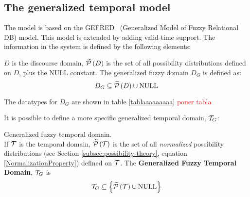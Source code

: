 %
%
%


\subsection{\label{subsec:temporal-model}The generalized temporal model}
The model is based on the GEFRED~\cite{Medina1994} (Generalized Model of Fuzzy Relational DB) model. This model is extended by adding valid-time support. The information in the system is defined by the following elements:

\begin{definition}
\label{def:generalized-fuzzy-domain}
$D$ is the discourse domain, $\widetilde {\mathcal{P}}\left(D \right)$ is the set of all possibility distributions defined on $D$, plus the NULL constant. The generalized fuzzy domain $D_G$ is defined as:
\begin{equation}
\label{eq:generalized-fuzzy-domain}
D_G \subseteq \widetilde {\mathcal{P}}\left(D \right)\cup \text{NULL}
\end{equation}
\end{definition}
The datatypes for $D_G$ are shown in table \ref{tablaaaaaaaaa}
\textcolor{red}{poner tabla}

It is possible to define a more specific generalized temporal domain, $\mathcal{T}_G$:

\begin{definition}
\label{def:generalized-fuzzy-temporal-domain}
Generalized fuzzy temporal domain.\\
If $\mathcal{T}$ is the temporal domain, $\widetilde {\mathcal{P}}\left( \mathcal{T}\right)$ is the set of all \emph{normalized} possibility distributions (see Section \ref{subsec:possibility-theory}, equation \eqref{NormalizationProperty}) defined on $\mathcal{T}$.
The \textbf{Generalized Fuzzy Temporal Domain}, $\mathcal{T}_G$ is
\begin{equation}
\mathcal{T}_G \subseteq \left \lbrace \widetilde {\mathcal{P}}\left( \mathcal{T}\right) \cup \text{NULL} \right \rbrace
\end{equation}
\end{definition}

